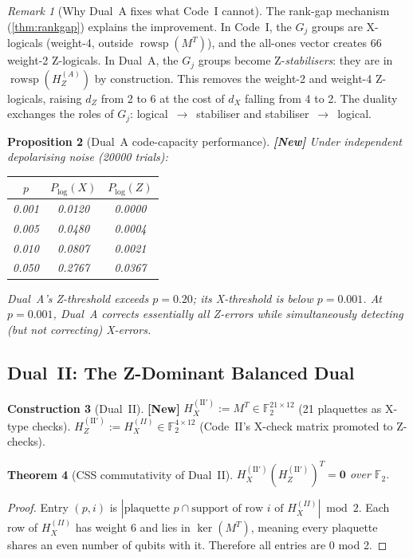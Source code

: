 \documentclass[12pt,a4paper]{article}
\theoremstyle{plain}
\newtheorem{theorem}{Theorem}[section]
\newtheorem{proposition}[theorem]{Proposition}
\theoremstyle{definition}
\newtheorem{construction}[theorem]{Construction}
\theoremstyle{remark}
\newtheorem{remark}[theorem]{Remark}
\newcommand{\GFtwo}{\mathbb{F}_2}
\newcommand{\rowsp}{\operatorname{rowsp}}
\newcommand{\NEW}{\textcolor{newcolor}{\textbf{[New]}}}
\begin{document}
\begin{remark}[Why Dual~A fixes what Code~I cannot]
The rank-gap mechanism (\cref{thm:rankgap}) explains the improvement.
In Code~I, the $G_j$ groups are X-logicals (weight-4, outside
$\rowsp(M^T)$), and the all-ones vector creates 66 weight-2 Z-logicals.
In Dual~A, the $G_j$ groups become Z-\emph{stabilisers}: they are in
$\rowsp(H_Z^{(A)})$ by construction.
This removes the weight-2 and weight-4 Z-logicals, raising $d_Z$ from
2 to 6 at the cost of $d_X$ falling from 4 to 2.
The duality exchanges the roles of $G_j$: logical~$\to$~stabiliser
and stabiliser~$\to$~logical.
\end{remark}

\begin{proposition}[Dual~A code-capacity performance]\label{prop:dualA_perf}
\NEW\; Under independent depolarising noise (20000 trials):
\begin{center}
\small
\begin{tabular}{ccc}
\toprule
$p$ & $P_{\log}(X)$ & $P_{\log}(Z)$ \\
\midrule
0.001 & 0.0120 & 0.0000 \\
0.005 & 0.0480 & 0.0004 \\
0.010 & 0.0807 & 0.0021 \\
0.050 & 0.2767 & 0.0367 \\
\bottomrule
\end{tabular}
\end{center}
Dual~A's Z-threshold exceeds $p=0.20$; its X-threshold is below $p=0.001$.
At $p=0.001$, Dual~A corrects essentially all Z-errors while
simultaneously detecting (but not correcting) X-errors.
\end{proposition}

\subsection{Dual~II: The Z-Dominant Balanced Dual}

\begin{construction}[Dual~II]\label{con:dualII}
\NEW\;
$H_X^{(\mathrm{II}')} := M^T \in \GFtwo^{21\times12}$
(21 plaquettes as X-type checks).
$H_Z^{(\mathrm{II}')} := H_X^{(II)} \in \GFtwo^{4\times12}$
(Code~II's X-check matrix promoted to Z-checks).
\end{construction}

\begin{theorem}[CSS commutativity of Dual~II]\label{thm:dualII_comm}
$H_X^{(\mathrm{II}')} (H_Z^{(\mathrm{II}')})^T = \bm{0}$ over $\GFtwo$.
\end{theorem}
\begin{proof}
Entry $(p, i)$ is $|\text{plaquette } p \cap \text{support of row } i
\text{ of } H_X^{(II)}| \bmod 2$.
Each row of $H_X^{(II)}$ has weight 6 and lies in $\ker(M^T)$, meaning
every plaquette shares an even number of qubits with it.
Therefore all entries are 0 mod 2. 
\end{proof}
\end{document}
